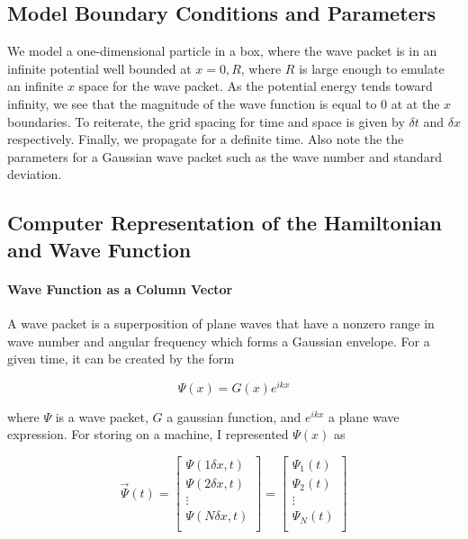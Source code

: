 \subsection*{Model Boundary Conditions and Parameters}
We model a one-dimensional particle in a box, where the wave packet is in an
infinite potential well bounded at $x = 0, R$, where $R$ is large enough to
emulate an infinite $x$ space for the wave packet. As the potential energy
tends toward infinity, we see that the magnitude of the wave function is
equal to 0 at at the $x$ boundaries. To reiterate, the grid spacing for time
and space is given by $\delta t$ and $\delta x$ respectively. Finally, we
propagate for a definite time. Also note the the parameters for a Gaussian
wave packet such as the wave number and standard deviation.

\subsection*{Computer Representation of the Hamiltonian and Wave Function}

\paragraph{Wave Function as a Column Vector}
A wave packet is a superposition of plane waves that have a nonzero range
in wave number and angular frequency which forms a Gaussian envelope. For a
given time, it can be created by the form

\vspace{-0.5cm}
\[
    \Psi(x) = G(x)e^{ikx}
\]

where $\Psi$ is a wave packet, $G$ a gaussian function, and $e^{ikx}$ a
plane wave expression. For storing on a machine, I represented $\Psi(x)$ as

\vspace{-0.2cm}
\[
    \vec{\Psi}(t) =
    \begin{bmatrix}
        \Psi(1 \delta x, t) \\
        \Psi(2 \delta x, t) \\
        \vdots \\
        \Psi(N \delta x, t) \\
    \end{bmatrix}
    =
    \begin{bmatrix}
        \Psi_1(t) \\
        \Psi_2(t) \\
        \vdots \\
        \Psi_N(t) \\
    \end{bmatrix}
\]

